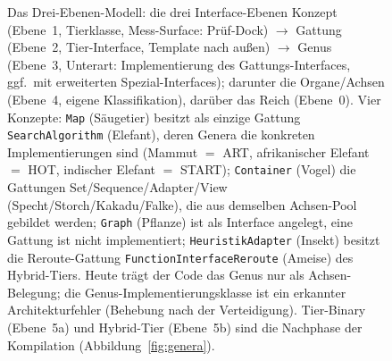 \begin{nurkurz}
\begin{figure}[htbp]
\caption{Das Drei-Ebenen-Modell: die drei Interface-Ebenen Konzept (Ebene~1, Tierklasse, Mess-Surface: Prüf-Dock) $\to$ Gattung (Ebene~2, Tier-Interface, Template nach außen) $\to$ Genus (Ebene~3, Unterart: Implementierung des Gattungs-Interfaces, ggf.\ mit erweiterten Spezial-Interfaces); darunter die Organe/Achsen (Ebene~4, eigene Klassifikation), darüber das Reich (Ebene~0). Vier Konzepte: \texttt{Map} (Säugetier) besitzt als einzige Gattung \texttt{SearchAlgorithm} (Elefant), deren Genera die konkreten Implementierungen sind (Mammut $=$ ART, afrikanischer Elefant $=$ HOT, indischer Elefant $=$ START); \texttt{Container} (Vogel) die Gattungen Set/Sequence/Adapter/View (Specht/Storch/Kakadu/Falke), die aus demselben Achsen-Pool gebildet werden; \texttt{Graph} (Pflanze) ist als Interface angelegt, eine Gattung ist nicht implementiert; \texttt{HeuristikAdapter} (Insekt) besitzt die Reroute-Gattung \texttt{FunctionInterfaceReroute} (Ameise) des Hybrid-Tiers. Heute trägt der Code das Genus nur als Achsen-Belegung; die Genus-Implementierungsklasse ist ein erkannter Architekturfehler (Behebung nach der Verteidigung). Tier-Binary (Ebene~5a) und Hybrid-Tier (Ebene~5b) sind die Nachphase der Kompilation (Abbildung~\ref{fig:genera}).}\label{fig:three-levels}
\end{figure}
\end{nurkurz}

